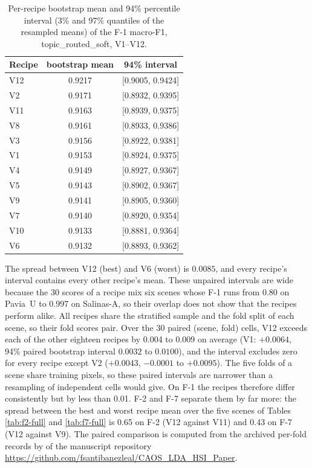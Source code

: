 \documentclass[journal,a4paper,10pt]{IEEEtran}
\begin{document}
\begin{table}[ht]
\caption{Per-recipe bootstrap mean and 94\% percentile interval
(3\% and 97\% quantiles of the resampled means) of the F-1 macro-F1,
topic\_routed\_soft, V1--V12.}
\label{tab:bootstrap}
\centering
\small
\begin{tabular}{lcc}
\toprule
Recipe & bootstrap mean & 94\% interval \\
\midrule
V12  & 0.9217 & [0.9005, 0.9424] \\
V2   & 0.9171 & [0.8932, 0.9395] \\
V11  & 0.9163 & [0.8939, 0.9375] \\
V8   & 0.9161 & [0.8933, 0.9386] \\
V3   & 0.9156 & [0.8922, 0.9381] \\
V1   & 0.9153 & [0.8924, 0.9375] \\
V4   & 0.9149 & [0.8927, 0.9367] \\
V5   & 0.9143 & [0.8902, 0.9367] \\
V9   & 0.9141 & [0.8905, 0.9360] \\
V7   & 0.9140 & [0.8920, 0.9354] \\
V10  & 0.9133 & [0.8881, 0.9364] \\
V6   & 0.9132 & [0.8893, 0.9362] \\
\bottomrule
\end{tabular}
\end{table}

The spread between V12 (best) and V6 (worst) is $0.0085$, and every
recipe's interval contains every other recipe's mean. These unpaired
intervals are wide because the 30 scores of a recipe mix six scenes
whose F-1 runs from 0.80 on Pavia~U to 0.997 on Salinas-A, so their
overlap does not show that the recipes perform alike. All recipes share
the stratified sample and the fold split of each scene, so their fold
scores pair. Over the 30 paired (scene, fold) cells, V12 exceeds each
of the other eighteen recipes by 0.004 to 0.009 on average (V1:
$+0.0064$, 94\% paired bootstrap interval $0.0032$ to $0.0100$), and the
interval excludes zero for every recipe except V2 ($+0.0043$, $-0.0001$
to $+0.0095$). The five folds of a scene share training pixels, so
these paired intervals are narrower than a resampling of independent
cells would give. On F-1 the recipes therefore differ consistently but
by less than 0.01. F-2 and F-7 separate them by far more: the spread
between the best and worst recipe mean over the five scenes of
Tables \ref{tab:f2-full} and \ref{tab:f7-full} is 0.65 on F-2 (V12
against V11) and 0.43 on F-7 (V12 against V9). The paired comparison is
computed from the archived per-fold records by
 of the manuscript repository
\url{https://github.com/fsantibanezleal/CAOS_LDA_HSI_Paper}.
\end{document}
